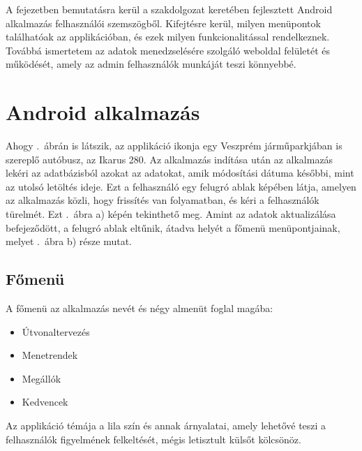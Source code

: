 
A fejezetben bemutatásra kerül a szakdolgozat keretében fejlesztett Android alkalmazás felhasználói szemszögből.
Kifejtésre kerül, milyen menüpontok találhatóak az applikációban, és ezek milyen funkcionalitással rendelkeznek.
Továbbá ismertetem az adatok menedzselésére szolgáló weboldal felületét és működését, amely az admin felhasználók munkáját teszi könnyebbé.

\section{Android alkalmazás}
\label{androidapp}
Ahogy .\ ábrán is látszik, az applikáció ikonja egy Veszprém járműparkjában is szereplő autóbusz, az Ikarus 280.
Az alkalmazás indítása után az alkalmazás lekéri az adatbázisból azokat az adatokat, amik módosítási dátuma későbbi, mint az utolsó letöltés ideje.
Ezt a felhasználó egy felugró ablak képében látja, amelyen az alkalmazás közli, hogy frissítés van folyamatban, és kéri a felhasználók türelmét.
Ezt .\ ábra a) képén tekinthető meg.
Amint az adatok aktualizálása befejeződött, a felugró ablak eltűnik, átadva helyét a főmenü menüpontjainak, melyet .\ ábra b) része mutat.
\subsection{Főmenü}
\label{fomenu}
A főmenü az alkalmazás nevét és négy almenüt foglal magába:
\begin{itemize}
	\item Útvonaltervezés
	\item Menetrendek
	\item Megállók
	\item Kedvencek
\end{itemize}

Az applikáció témája a lila szín és annak árnyalatai, amely lehetővé teszi a felhasználók figyelmének felkeltését, mégis letisztult külsőt kölcsönöz.


